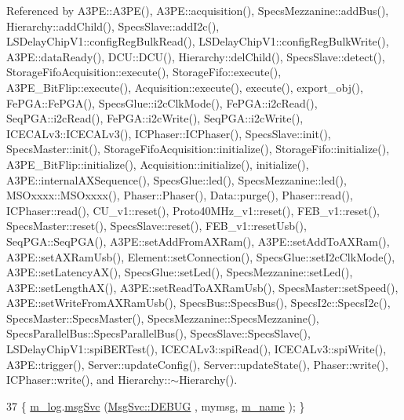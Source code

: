 Referenced by A3\+P\+E\+::\+A3\+P\+E(), A3\+P\+E\+::acquisition(), Specs\+Mezzanine\+::add\+Bus(), Hierarchy\+::add\+Child(), Specs\+Slave\+::add\+I2c(), L\+S\+Delay\+Chip\+V1\+::config\+Reg\+Bulk\+Read(), L\+S\+Delay\+Chip\+V1\+::config\+Reg\+Bulk\+Write(), A3\+P\+E\+::data\+Ready(), D\+C\+U\+::\+D\+C\+U(), Hierarchy\+::del\+Child(), Specs\+Slave\+::detect(), Storage\+Fifo\+Acquisition\+::execute(), Storage\+Fifo\+::execute(), A3\+P\+E\+\_\+\+Bit\+Flip\+::execute(), Acquisition\+::execute(), execute(), export\+\_\+obj(), Fe\+P\+G\+A\+::\+Fe\+P\+G\+A(), Specs\+Glue\+::i2c\+Clk\+Mode(), Fe\+P\+G\+A\+::i2c\+Read(), Seq\+P\+G\+A\+::i2c\+Read(), Fe\+P\+G\+A\+::i2c\+Write(), Seq\+P\+G\+A\+::i2c\+Write(), I\+C\+E\+C\+A\+Lv3\+::\+I\+C\+E\+C\+A\+Lv3(), I\+C\+Phaser\+::\+I\+C\+Phaser(), Specs\+Slave\+::init(), Specs\+Master\+::init(), Storage\+Fifo\+Acquisition\+::initialize(), Storage\+Fifo\+::initialize(), A3\+P\+E\+\_\+\+Bit\+Flip\+::initialize(), Acquisition\+::initialize(), initialize(), A3\+P\+E\+::internal\+A\+X\+Sequence(), Specs\+Glue\+::led(), Specs\+Mezzanine\+::led(), M\+S\+Oxxxx\+::\+M\+S\+Oxxxx(), Phaser\+::\+Phaser(), Data\+::purge(), Phaser\+::read(), I\+C\+Phaser\+::read(), C\+U\+\_\+v1\+::reset(), Proto40\+M\+Hz\+\_\+v1\+::reset(), F\+E\+B\+\_\+v1\+::reset(), Specs\+Master\+::reset(), Specs\+Slave\+::reset(), F\+E\+B\+\_\+v1\+::reset\+Usb(), Seq\+P\+G\+A\+::\+Seq\+P\+G\+A(), A3\+P\+E\+::set\+Add\+From\+A\+X\+Ram(), A3\+P\+E\+::set\+Add\+To\+A\+X\+Ram(), A3\+P\+E\+::set\+A\+X\+Ram\+Usb(), Element\+::set\+Connection(), Specs\+Glue\+::set\+I2c\+Clk\+Mode(), A3\+P\+E\+::set\+Latency\+A\+X(), Specs\+Glue\+::set\+Led(), Specs\+Mezzanine\+::set\+Led(), A3\+P\+E\+::set\+Length\+A\+X(), A3\+P\+E\+::set\+Read\+To\+A\+X\+Ram\+Usb(), Specs\+Master\+::set\+Speed(), A3\+P\+E\+::set\+Write\+From\+A\+X\+Ram\+Usb(), Specs\+Bus\+::\+Specs\+Bus(), Specs\+I2c\+::\+Specs\+I2c(), Specs\+Master\+::\+Specs\+Master(), Specs\+Mezzanine\+::\+Specs\+Mezzanine(), Specs\+Parallel\+Bus\+::\+Specs\+Parallel\+Bus(), Specs\+Slave\+::\+Specs\+Slave(), L\+S\+Delay\+Chip\+V1\+::spi\+B\+E\+R\+Test(), I\+C\+E\+C\+A\+Lv3\+::spi\+Read(), I\+C\+E\+C\+A\+Lv3\+::spi\+Write(), A3\+P\+E\+::trigger(), Server\+::update\+Config(), Server\+::update\+State(), Phaser\+::write(), I\+C\+Phaser\+::write(), and Hierarchy\+::$\sim$\+Hierarchy().


\begin{DoxyCode}
37 \{ \hyperlink{classObject_a0d269813dd7ac1f24bc143031e2963f2}{m\_log}.\hyperlink{classMsgSvc_ad25f18047920cc59a314e5098259711c}{msgSvc} (\hyperlink{classMsgSvc_ae671eb7301996cd049d2da8a65925926a1dbdcc82dce88370ec335883c83b38b0}{MsgSvc::DEBUG}   , mymsg, \hyperlink{classObject_a8b83c95c705d2c3ba0d081fe1710f48d}{m\_name} ); \}
\end{DoxyCode}
\mbox{\label{classObject_a6c9a0397ca804e04d675ed05683f5420}} 
